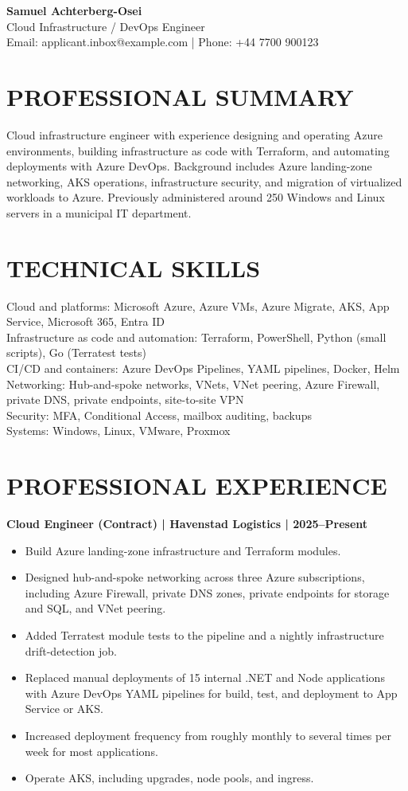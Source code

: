 \documentclass[11pt,a4paper]{article}
\begin{document}
\begin{center}
{\Huge\bfseries\color{primarycolor} Samuel Achterberg-Osei}\\[0.3em]
{\large\color{accentcolor} Cloud Infrastructure / DevOps Engineer}\\[0.3em]
Email: applicant.inbox@example.com \quad | \quad Phone: +44 7700 900123
\end{center}

\section*{PROFESSIONAL SUMMARY}
Cloud infrastructure engineer with experience designing and operating Azure environments, building infrastructure as code with Terraform, and automating deployments with Azure DevOps. Background includes Azure landing-zone networking, AKS operations, infrastructure security, and migration of virtualized workloads to Azure. Previously administered around 250 Windows and Linux servers in a municipal IT department.

\section*{TECHNICAL SKILLS}
Cloud and platforms: Microsoft Azure, Azure VMs, Azure Migrate, AKS, App Service, Microsoft 365, Entra ID\\
Infrastructure as code and automation: Terraform, PowerShell, Python (small scripts), Go (Terratest tests)\\
CI/CD and containers: Azure DevOps Pipelines, YAML pipelines, Docker, Helm\\
Networking: Hub-and-spoke networks, VNets, VNet peering, Azure Firewall, private DNS, private endpoints, site-to-site VPN\\
Security: MFA, Conditional Access, mailbox auditing, backups\\
Systems: Windows, Linux, VMware, Proxmox

\section*{PROFESSIONAL EXPERIENCE}
\textbf{Cloud Engineer (Contract) | Havenstad Logistics | 2025--Present}
\begin{itemize}
\item Build Azure landing-zone infrastructure and Terraform modules.
\item Designed hub-and-spoke networking across three Azure subscriptions, including Azure Firewall, private DNS zones, private endpoints for storage and SQL, and VNet peering.
\item Added Terratest module tests to the pipeline and a nightly infrastructure drift-detection job.
\item Replaced manual deployments of 15 internal .NET and Node applications with Azure DevOps YAML pipelines for build, test, and deployment to App Service or AKS.
\item Increased deployment frequency from roughly monthly to several times per week for most applications.
\item Operate AKS, including upgrades, node pools, and ingress.
\end{itemize}
\end{document}
